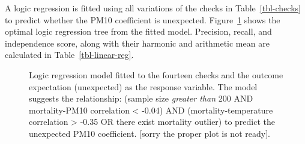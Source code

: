 \documentclass[
  12pt,
]{interact}
\begin{document}
A logic regression is fitted using all variations of the checks in
Table~\ref{tbl-checks} to predict whether the PM10 coefficient is
unexpected. Figure~\ref{fig-linear-reg-tree} shows the optimal logic
regression tree from the fitted model. Precision, recall, and
independence score, along with their harmonic and arithmetic mean are
calculated in Table~\ref{tbl-linear-reg}.

\begin{figure}


\caption{\label{fig-linear-reg-tree}Logic regression model fitted to the
fourteen checks and the outcome expectation (unexpected) as the response
variable. The model suggests the relationship: (sample size
\emph{greater than} 200 AND mortality-PM10 correlation \textless{}
-0.04) AND (mortality-temperature correlation \textgreater{} -0.35 OR
there exist mortality outlier) to predict the unexpected PM10
coefficient. {[}sorry the proper plot is not ready{]}.}

\end{figure}%
\end{document}
